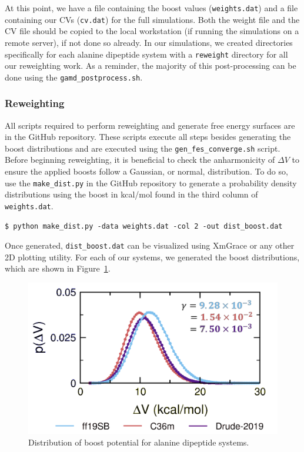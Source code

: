 \documentclass[9pt,tutorial]{livecoms}
\begin{document}
At this point, we have a file containing the boost values (\texttt{weights.dat}) and a file containing our CVs (\texttt{cv.dat}) for the full simulations. Both the weight file and the CV file should be copied to the local workstation (if running the simulations on a remote server), if not done so already. In our simulations, we created directories specifically for each alanine dipeptide system with a \texttt{reweight} directory for all our reweighting work. As a reminder, the majority of this post-processing can be done using the \texttt{gamd\_postprocess.sh}.   

\subsubsection{Reweighting} \label{ss:tutorial_reweight} 
 All scripts required to perform reweighting and generate free energy surfaces are in the GitHub repository. These scripts execute all steps besides generating the boost distributions and are executed using the \texttt{gen\_fes\_converge.sh} script. Before beginning reweighting, it is beneficial to check the anharmonicity of $\Delta{V}$ to ensure the applied boosts follow a Gaussian, or normal, distribution. To do so, use the \texttt{make\_dist.py} in the GitHub repository to generate a probability density distributions using the boost in kcal/mol found in the third column of \texttt{weights.dat}. 

\bigskip
\begin{lstlisting}[style=MyBash]
$ python make_dist.py -data weights.dat -col 2 -out dist_boost.dat
\end{lstlisting}

Once generated, \texttt{dist\_boost.dat} can be visualized using XmGrace or any other 2D plotting utility. For each of our systems, we generated the boost distributions, which are shown in Figure~\ref{fig:dist_boost}.

\begin{figure}[h]
    \includegraphics[width=\columnwidth]{main_figs/dist_boost_allffs.png}
    \caption{Distribution of boost potential for alanine dipeptide systems.}
    \label{fig:dist_boost}
\end{figure}
\end{document}
